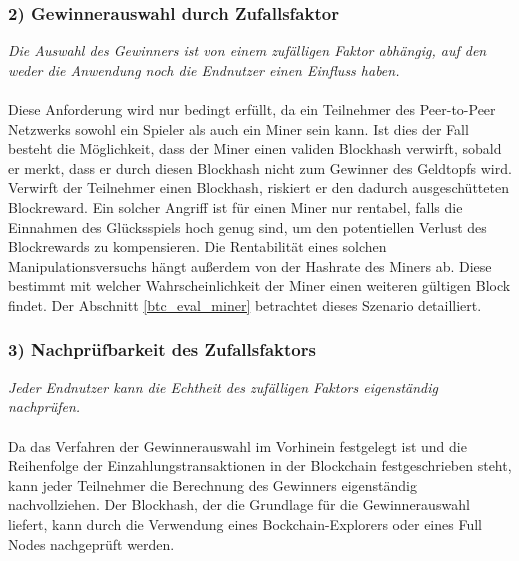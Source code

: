\subsubsection{2) Gewinnerauswahl durch Zufallsfaktor}
\textit{Die Auswahl des Gewinners ist von einem zufälligen Faktor abhängig, auf den weder die Anwendung noch die Endnutzer einen Einfluss haben.}\\\\
Diese Anforderung wird nur bedingt erfüllt, da ein Teilnehmer des Peer-to-Peer Netzwerks sowohl ein Spieler als auch ein Miner sein kann. Ist dies der Fall besteht die Möglichkeit, dass der Miner einen validen Blockhash verwirft, sobald er merkt, dass er durch diesen Blockhash nicht zum Gewinner des Geldtopfs wird. Verwirft der Teilnehmer einen Blockhash, riskiert er den dadurch ausgeschütteten Blockreward. Ein solcher Angriff ist für einen Miner nur rentabel, falls die Einnahmen des Glücksspiels hoch genug sind, um den potentiellen Verlust des Blockrewards zu kompensieren. Die Rentabilität eines solchen Manipulationsversuchs hängt außerdem von der Hashrate des Miners ab. Diese bestimmt mit welcher Wahrscheinlichkeit der Miner einen weiteren gültigen Block findet. Der Abschnitt \ref{btc_eval_miner} betrachtet dieses Szenario detailliert. %

\subsubsection{3) Nachprüfbarkeit des Zufallsfaktors}
\textit{Jeder Endnutzer kann die Echtheit des zufälligen Faktors eigenständig nachprüfen.}\\\\
Da das Verfahren der Gewinnerauswahl im Vorhinein festgelegt ist und die Reihenfolge der Einzahlungstransaktionen in der Blockchain festgeschrieben steht, kann jeder Teilnehmer die Berechnung des Gewinners eigenständig nachvollziehen.
\newpage
\noindent Der Blockhash, der die Grundlage für die Gewinnerauswahl liefert, kann durch die Verwendung eines Bockchain-Explorers oder eines Full Nodes nachgeprüft werden. 
